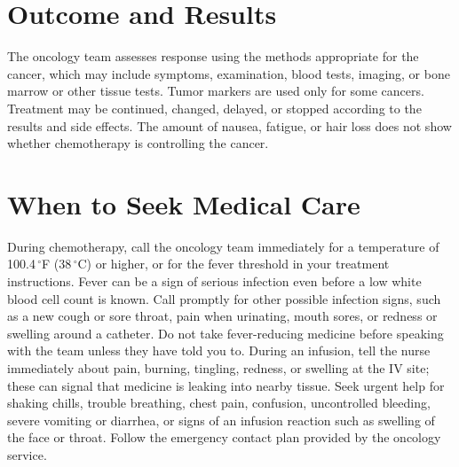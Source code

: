 \section*{Outcome and Results}
The oncology team assesses response using the methods appropriate for the cancer, which may include symptoms, examination, blood tests, imaging, or bone marrow or other tissue tests. Tumor markers are used only for some cancers. Treatment may be continued, changed, delayed, or stopped according to the results and side effects. The amount of nausea, fatigue, or hair loss does not show whether chemotherapy is controlling the cancer.

\section*{When to Seek Medical Care}
During chemotherapy, call the oncology team immediately for a temperature of 100.4\,$^{\circ}$F (38\,$^{\circ}$C) or higher, or for the fever threshold in your treatment instructions. Fever can be a sign of serious infection even before a low white blood cell count is known. Call promptly for other possible infection signs, such as a new cough or sore throat, pain when urinating, mouth sores, or redness or swelling around a catheter. Do not take fever-reducing medicine before speaking with the team unless they have told you to. During an infusion, tell the nurse immediately about pain, burning, tingling, redness, or swelling at the IV site; these can signal that medicine is leaking into nearby tissue. Seek urgent help for shaking chills, trouble breathing, chest pain, confusion, uncontrolled bleeding, severe vomiting or diarrhea, or signs of an infusion reaction such as swelling of the face or throat. Follow the emergency contact plan provided by the oncology service.

